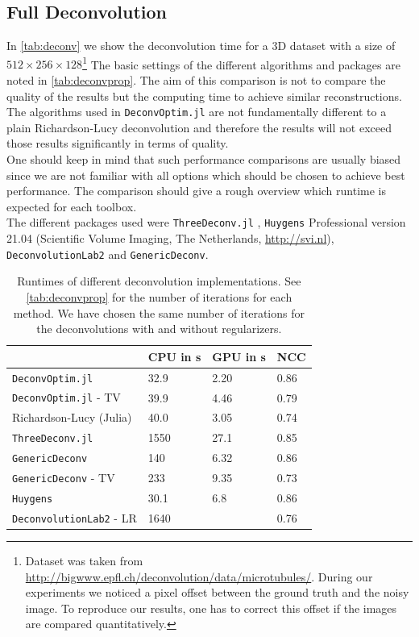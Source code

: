 \documentclass{juliacon}
\begin{document}
    \subsection{Full Deconvolution}
        In \autoref{tab:deconv} we show the deconvolution time for a 3D dataset with a size of $512 \times 256 \times 128$\footnote{Dataset was taken from \url{http://bigwww.epfl.ch/deconvolution/data/microtubules/}\cite{deconvlab2}. During our experiments we noticed a pixel offset between the ground truth and the noisy image. To reproduce our results, one has to correct this offset if the images are compared quantitatively.} 
        The basic settings of the different algorithms and packages are noted in \autoref{tab:deconvprop}.
        The aim of this comparison is not to compare the quality of the results but the computing time to achieve similar reconstructions. 
        The algorithms used in \verb|DeconvOptim.jl| are not fundamentally different to a plain Richardson-Lucy deconvolution and therefore the results will 
        not exceed those results significantly in terms of quality.\\
        One should keep in mind that such performance comparisons are usually biased since we are not
        familiar with all options which should be chosen to achieve best performance.
        The comparison should give a rough overview which runtime is expected for each toolbox.\\
        The different packages used were \verb|ThreeDeconv.jl| \cite{ikoma2018convex}, \verb|Huygens| Professional version 21.04 (Scientific Volume Imaging, The Netherlands, \url{http://svi.nl}), \verb|DeconvolutionLab2| \cite{deconvlab2} and \verb|GenericDeconv|.  

        \begin{table}[h]
            \begin{tabular}{l l l l }
                &  CPU in \si{\second}& GPU in \si{\second} & NCC\\ 
            \hline
            \verb|DeconvOptim.jl| & 32.9 & 2.20 & 0.86\\
            \verb|DeconvOptim.jl| - TV & 39.9 & 4.46 & 0.79\\
            Richardson-Lucy (Julia) & 40.0 & 3.05 & 0.74 \\
            \verb|ThreeDeconv.jl|& 1550 & 27.1 & 0.85\\
            \verb|GenericDeconv|  & 140 & 6.32 & 0.86\\
            \verb|GenericDeconv| - TV & 233 & 9.35 & 0.73\\
            \verb|Huygens| & 30.1 & 6.8 & 0.86\\
            \verb|DeconvolutionLab2| - LR& 1640 & & 0.76\\
            \end{tabular}
            \caption{Runtimes of different deconvolution implementations. See \autoref{tab:deconvprop} for the number of iterations
            for each method. We have chosen the same number of iterations for the deconvolutions with and without regularizers.}
            \label{tab:deconv}
        \end{table}
\end{document}
